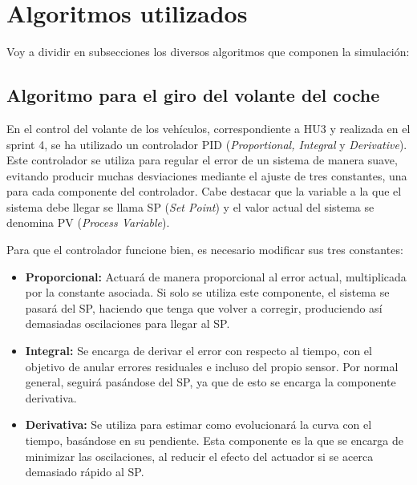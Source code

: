 \newpage

\section{Algoritmos utilizados}

Voy a dividir en subsecciones los diversos algoritmos que componen la simulación:

\subsection{Algoritmo para el giro del volante del coche}

En el control del volante de los vehículos, correspondiente a HU3 y realizada en el sprint 4, se ha utilizado un controlador PID (\textit{Proportional, Integral} y \textit{Derivative}). Este controlador se utiliza para regular el error de un sistema de manera suave, evitando producir muchas desviaciones mediante el ajuste de tres constantes, una para cada componente del controlador. Cabe destacar que la variable a la que el sistema debe llegar se llama SP (\textit{Set Point}) y el valor actual del sistema se denomina PV (\textit{Process Variable}). 

\bigskip

Para que el controlador funcione bien, es necesario modificar sus tres constantes: 

\begin{itemize}
    \item \textbf{Proporcional: }Actuará de manera proporcional al error actual, multiplicada por la constante asociada. Si solo se utiliza este componente, el sistema se pasará del SP, haciendo que tenga que volver a corregir, produciendo así demasiadas oscilaciones para llegar al SP. 

    \item \textbf{Integral: }Se encarga de derivar el error con respecto al tiempo, con el objetivo de anular errores residuales e incluso del propio sensor. Por normal general, seguirá pasándose del SP, ya que de esto se encarga la componente derivativa.

    \item \textbf{Derivativa: }Se utiliza para estimar como evolucionará la curva con el tiempo, basándose en su pendiente. Esta componente es la que se encarga de minimizar las oscilaciones, al reducir el efecto del actuador si se acerca demasiado rápido al SP.
\end{itemize}

